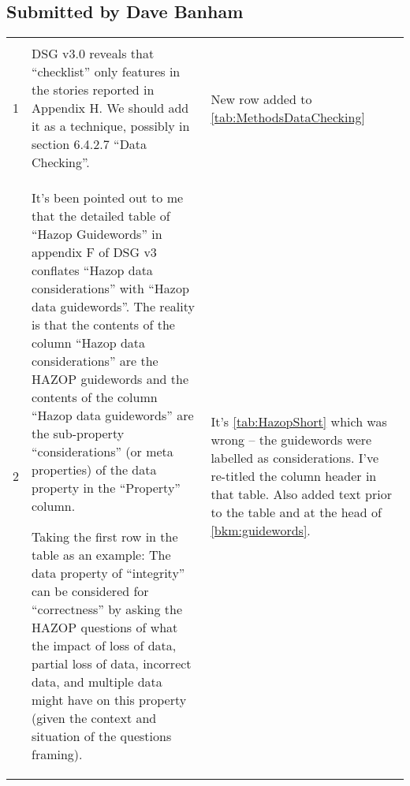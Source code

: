 \subsection{Submitted by Dave Banham}
\begin{longtable}[H]
{|L{}|L{}|L{}|}
\hline
{} &  & \\
\hline
  \endfirsthead
  \hline{} &  & \\\hline
  \endhead
  \endfoot
  \endlastfoot

  1&DSG v3.0 reveals that “checklist” only features in the stories reported in Appendix H. We should add it as a technique, possibly in section 6.4.2.7 “Data Checking”.&New row added to \autoref{tab:MethodsDataChecking}\\\hline
  2&It’s been pointed out to me that the detailed table of “Hazop Guidewords” in appendix F of DSG v3 conflates “Hazop data considerations” with “Hazop data guidewords”. The reality is that the contents of the column “Hazop data considerations” are the HAZOP guidewords and the contents of the column “Hazop data guidewords” are the sub-property “considerations” (or meta properties) of the data property in the “Property” column.

  Taking the first row in the table as an example: The data property of “integrity” can be considered for “correctness” by asking the HAZOP questions of what the impact of loss of data, partial loss of data, incorrect data, and multiple data might have on this property (given the context and situation of the questions framing).&It's \autoref{tab:HazopShort} which was wrong -- the guidewords were labelled as considerations. I've re-titled the column header in that table. Also added text prior to the table and at the head of \autoref{bkm:guidewords}.\\\hline
\end{longtable}

